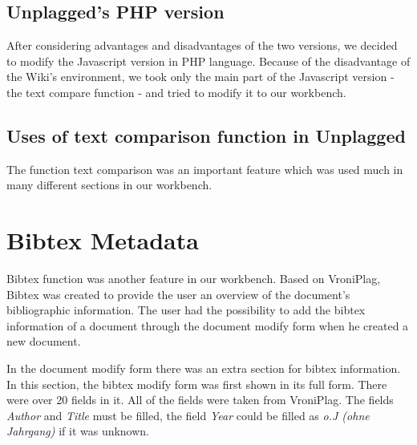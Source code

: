 \subsection{Unplagged’s PHP version}
After considering advantages and disadvantages of the two versions, we decided to modify the Javascript version in PHP language. Because of the disadvantage of the Wiki’s environment, we took only the main part of the Javascript version - the text compare function - and tried to modify it to our workbench.







\subsection{Uses of text comparison function in Unplagged}
The function text comparison was an important feature which was used much in many different sections in our workbench.







\pagebreak

\section{Bibtex Metadata}

Bibtex function was another feature in our workbench. Based on VroniPlag, Bibtex was created to provide the user an overview of the document's bibliographic information. The user had the possibility to add the bibtex information of a document through the document modify form when he created a new document. 

In the document modify form there was an extra section for bibtex information. In this section, the bibtex modify form was first shown in its full form. There were over 20 fields in it. All of the fields were taken from VroniPlag. The fields \textit{Author} and \textit{Title} must be filled, the field \textit{Year} could be filled as \textit{o.J (ohne Jahrgang)} if it was unknown.

